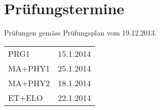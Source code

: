 
\section{Prüfungstermine}
Prüfungen gemäss Prüfungsplan vom 19.12.2013. 

\begin{tabular}{ll}
PRG1    & 15.1.2014 \\
MA+PHY1 & 25.1.2014 \\
MA+PHY2 & 18.1.2014 \\
ET+ELO  & 22.1.2014
\end{tabular}